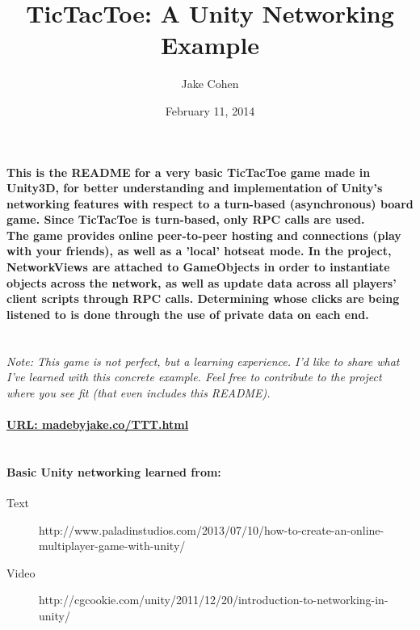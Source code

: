 \documentclass[12pt, fullpage]{article}
\begin{document}
\title{TicTacToe: A Unity Networking Example}
\author{Jake Cohen}
\date{February 11, 2014}
\maketitle

\paragraph{This is the README for a very basic TicTacToe game made in Unity3D, for better understanding and implementation of Unity's networking features with respect to a turn-based (asynchronous) board game. Since TicTacToe is turn-based, only RPC calls are used.\\The game provides online peer-to-peer hosting and connections (play with your friends), as well as a 'local' hotseat mode. In the project, NetworkViews are attached to GameObjects in order to instantiate objects across the network, as well as update data across all players' client scripts through RPC calls. Determining whose clicks are being listened to is done through the use of private data on each end. }

\emph{\\Note: This game is not perfect, but a learning experience. I'd like to share what I've learned with this concrete example. Feel free to contribute to the project where you see fit (that even includes this README).\\}

\paragraph{\underline{URL: madebyjake.co/TTT.html}}

\paragraph{\\Basic Unity networking learned from:}
\begin{description}
\item[Text] http://www.paladinstudios.com/2013/07/10/how-to-create-an-online-multiplayer-game-with-unity/
\item[Video] http://cgcookie.com/unity/2011/12/20/introduction-to-networking-in-unity/
\end{description}
\end{document}
